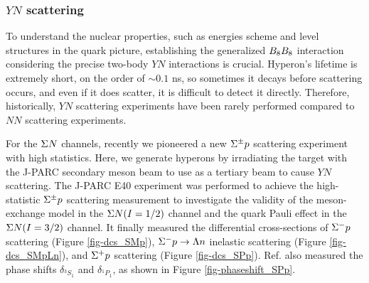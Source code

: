 \subsubsection{$YN$ scattering}
To understand the nuclear properties, such as energies scheme and level structures in the quark picture, establishing the generalized $B_{8}B_{8}$ interaction considering the precise two-body $YN$ interactions is crucial. Hyperon's lifetime is extremely short, on the order of $\sim0.1$ ns, so sometimes it decays before scattering occurs, and even if it does scatter, it is difficult to detect it directly. Therefore, historically, $YN$ scattering experiments have been rarely performed compared to $NN$ scattering experiments.

For the $\Sigma N$ channels, recently we pioneered a new $\Sigma^{\pm}p$ scattering experiment with high statistics. Here, we generate hyperons by irradiating the target with the J-PARC secondary meson beam to use as a tertiary beam to cause $YN$ scattering. %
The J-PARC E40 experiment was performed to achieve the high-statistic $\Sigma^{\pm}p$ scattering measurement to investigate the validity of the meson-exchange model in the $\Sigma N(I=1/2)$ channel and the quark Pauli effect in the $\Sigma N(I=3/2)$ channel. It finally measured the differential cross-sections of $\Sigma^{-}p$ scattering \cite{Miwa-SMp} (Figure \ref{fig-dcs_SMp}), $\Sigma^- p \to \Lambda n$ inelastic scattering \cite{Miwa-SMLn} (Figure \ref{fig-dcs_SMpLn}), and $\Sigma^{+}p$ scattering \cite{Nana-SPp} (Figure \ref{fig-dcs_SPp}). Ref. \cite{Nana-SPp} also measured the phase shifts $\delta_{^3S_1}$ and $\delta_{^1P_1}$, as shown in Figure \ref{fig-phaseshift_SPp}.

